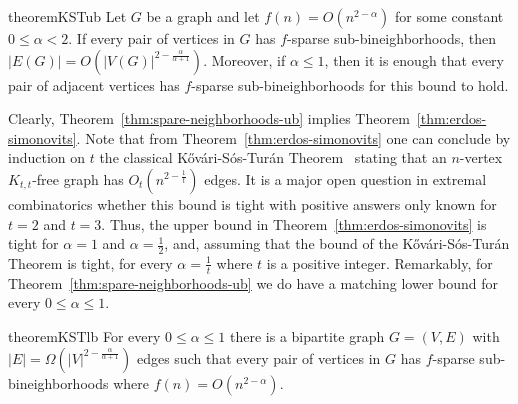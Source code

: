 \documentclass[11pt]{article}
\newtheorem{theorem}{Theorem}
\theoremstyle{definition}
\begin{document}
\begin{restatable}{theorem}{KSTub}
	\label{thm:spare-neighborhoods-ub}
	Let $G$ be a graph and let $f(n)=O(n^{2-\alpha})$ for some constant $0 \le \alpha <2$.
	If every pair of vertices in $G$ has $f$-sparse sub-bineighborhoods, then $|E(G)|  = O\left(|V(G)|^{2-\frac{\alpha}{\alpha+1}}\right)$.
	Moreover, if $\alpha \le 1$, then it is enough that every pair of adjacent vertices has $f$-sparse sub-bineighborhoods for this bound to hold.
\end{restatable}	


Clearly, Theorem~\ref{thm:spare-neighborhoods-ub} implies Theorem~\ref{thm:erdos-simonovits}. %
Note that from Theorem~\ref{thm:erdos-simonovits} one can conclude by induction on $t$ the classical K\H{o}v\'ari-S\'os-Tur\'an Theorem~\cite{Kovari} stating that an $n$-vertex $K_{t,t}$-free graph has $O_t\left(n^{2-\frac{1}{t}}\right)$ edges.
It is a major open question in extremal combinatorics whether this bound is tight with positive answers only known for $t=2$ and $t=3$.
Thus, the upper bound in Theorem~\ref{thm:erdos-simonovits} is tight for $\alpha=1$ and $\alpha=\frac{1}{2}$, and, assuming that the bound of the K\H{o}v\'ari-S\'os-Tur\'an Theorem is tight, for every $\alpha=\frac{1}{t}$ where $t$ is a positive integer.
Remarkably, for Theorem~\ref{thm:spare-neighborhoods-ub} we do have a matching lower bound for every $0 \le \alpha \le 1$.

\begin{restatable}{theorem}{KSTlb}
	\label{thm:spare-neighborhoods-lb}
	For every $0 \le \alpha \le 1$ there is a bipartite graph $G=(V,E)$ with $|E|=\Omega\left(|V|^{2-\frac{\alpha}{\alpha+1}}\right)$ edges such that every pair of vertices in $G$ has $f$-sparse sub-bineighborhoods where $f(n)=O(n^{2-\alpha})$.
\end{restatable}
\end{document}
